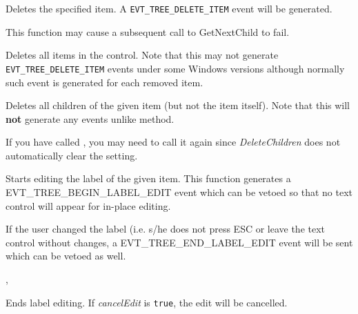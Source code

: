 
Deletes the specified item. A {\tt EVT\_TREE\_DELETE\_ITEM} event will be
generated.

This function may cause a subsequent call to GetNextChild to fail.


\label{wxtreectrldeleteallitems}


Deletes all items in the control. Note that this may not generate
{\tt EVT\_TREE\_DELETE\_ITEM} events under some Windows versions although
normally such event is generated for each removed item.


\label{wxtreectrldeletechildren}


Deletes all children of the given item (but not the item itself). Note that
this will {\bf not} generate any events unlike
 method.

If you have called , you
may need to call it again since {\it DeleteChildren} does not automatically
clear the setting.


\label{wxtreectrleditlabel}


Starts editing the label of the given item. This function generates a
EVT\_TREE\_BEGIN\_LABEL\_EDIT event which can be vetoed so that no
text control will appear for in-place editing.

If the user changed the label (i.e. s/he does not press ESC or leave
the text control without changes, a EVT\_TREE\_END\_LABEL\_EDIT event
will be sent which can be vetoed as well.


,


\label{wxtreectrlendeditlabel}


Ends label editing. If {\it cancelEdit} is {\tt true}, the edit will be cancelled.

